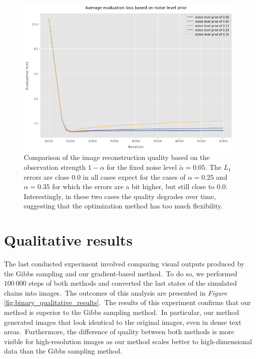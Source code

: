 \documentclass[shortabstract, english, lic]{iithesis}
\theoremstyle{default_theorem_style}\newtheorem{theorem}{Theorem}
\theoremstyle{default_theorem_style}\newtheorem{definition}{Definition}
\begin{document}
\begin{figure}[H]
\centering
\includegraphics[scale=0.55]{binary_noise_level_prior_plots}
\caption{Comparison of the image reconstruction quality based on the observation strength $1 - \alpha$ for the
fixed noise level $\tilde{\alpha} = 0.05$. The $L_1$ errors are close $0.0$ in all cases expect for the cases of
$\alpha = 0.25$ and $\alpha = 0.35$ for which the errors are a bit higher, but still close to $0.0$. Interestingly,
in these two cases the quality degrades over time, suggesting that the optimization method has too
much flexibility.}
\label{fig:binary_noise_level_prior_plots}
\end{figure}

\section{Qualitative results}

The last conducted experiment involved comparing visual outputs produced by the Gibbs sampling and our
gradient-based method.\ To do so, we performed $100\ 000$ steps of both methods and converted the last states
of the simulated chains into images.\ The outcomes of this analysis are presented in \textit{Figure}
\ref{fig:binary_qualitative_results}.\ The results of this experiment confirms that our method is superior to
the Gibbs sampling method.\ In particular, our method generated images that look identical to the original images,
even in dense text areas.\ Furthermore, the difference of quality between both methods is more visible for
high-resolution images as our method scales better to high-dimensional data than the Gibbs sampling
method.\newline\newline\newline\newline\newline\newline
\end{document}
